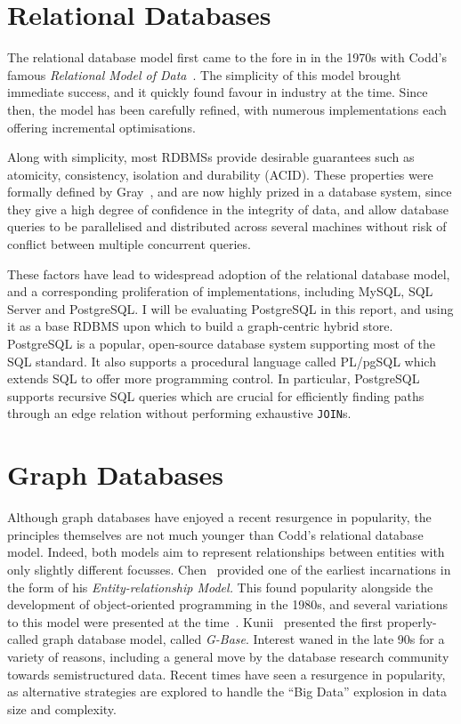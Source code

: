 \section{Relational Databases}

The relational database model first came to the fore in in the 1970s with
Codd's famous \textit{Relational Model of Data}~\cite{Codd}. The simplicity of this
model brought immediate success, and it quickly found favour in
industry at the time. Since then, the model has been carefully refined, with
numerous implementations each offering incremental optimisations.

Along with simplicity, most RDBMSs provide desirable guarantees such as
atomicity, consistency, isolation and durability (ACID). These properties were
formally defined by Gray~\cite{gray1981transaction}, and are now highly prized in a database system,
since they give a high degree of confidence in the integrity of data, and
allow database queries to be parallelised and distributed across several machines
without risk of conflict between multiple concurrent queries.

These factors have lead to widespread adoption of the relational database
model,  and a corresponding proliferation of implementations, including MySQL,
SQL Server and PostgreSQL. I will be evaluating PostgreSQL in this report, and
using it as a base RDBMS upon which to build a graph-centric hybrid
store. PostgreSQL is a popular, open-source database system supporting most of
the SQL standard. It also supports a procedural language called PL/pgSQL which
extends SQL to offer more programming control. In particular, PostgreSQL
supports recursive SQL queries which are crucial for efficiently finding
paths through an edge relation without performing exhaustive \texttt{JOIN}s.

\section{Graph Databases}

Although graph databases have enjoyed a recent resurgence in popularity, the
principles themselves are not much younger than Codd's relational database
model. Indeed, both models aim to represent relationships between entities with only slightly different focusses.
Chen~\cite{Chen} provided one of the earliest incarnations in the form of his
\textit{Entity-relationship Model.} This found popularity alongside the development
of object-oriented programming in the 1980s, and several variations to this
model were presented at the time~\cite{Kim}\cite{Abiteboul}.
Kunii~\cite{Kunii:1987:DGD:42040.42071} presented the first properly-called
graph database model, called \textit{G-Base}. Interest waned in the late 90s for a
variety of reasons, including a general move by the database research
community towards semistructured data. Recent times have seen a resurgence in
popularity, as alternative strategies are explored to handle the ``Big Data''
explosion in data size and complexity.

